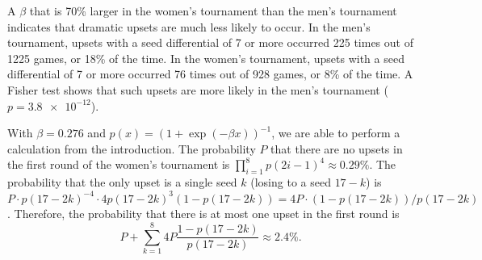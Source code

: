 \documentclass{article}
\begin{document}
A $\beta$ that is 70\% larger in the women's tournament than the men's tournament indicates that dramatic upsets are much less likely to occur.  In the men's tournament, upsets with a seed differential of 7 or more occurred 225 times out of 1225 games, or 18\% of the time.
In the women's tournament, upsets with a seed differential of 7 or more occurred 76 times out of 928 games, or 8\% of the time.
A Fisher test shows that such upsets are more likely in the men's tournament ($p=\num{3.8e-12}$).

With $\beta=0.276$ and $p(x)=(1+\exp(-\beta x))^{-1}$, we are able to perform a calculation from the introduction.  The probability $P$ that there are no upsets in the first round of the women's tournament is $\prod_{i=1}^8 p(2i-1)^4\approx0.29\%$. The probability that the only upset is a single seed $k$ (losing to a seed $17-k$) is $P\cdot p(17-2k)^{-4}\cdot4p(17-2k)^3(1-p(17-2k))=4P\cdot(1-p(17-2k))/p(17-2k)$.  Therefore, the probability that there is at most one upset in the first round is
\[P+\sum_{k=1}^8 4P\frac{1-p(17-2k)}{p(17-2k)}\approx2.4\%.\]
\end{document}
